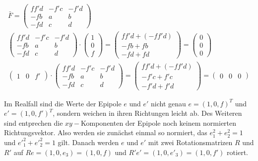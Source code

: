 


\begin{gather}
	\bar{F} = \begin{pmatrix}
	ff'd&-f'c&-f'd\\
	-fb&a&b\\
	-fd&c&d\label{eq:FSampson}
	\end{pmatrix}\\
	\begin{pmatrix}
	ff'd&-f'c&-f'd\\
	-fb&a&b\\
	-fd&c&d
	\end{pmatrix} \cdot \begin{pmatrix}
	1\\0\\f
	\end{pmatrix} = 
	\begin{pmatrix}
	ff'd + (-ff'd)\\
	-fb + fb\\
	-fd +fd
	\end{pmatrix}
	= 
	\begin{pmatrix}
	0\\0\\0
	\end{pmatrix}\\
	\begin{pmatrix}
	1&0&f'
	\end{pmatrix} \cdot
	\begin{pmatrix}
	ff'd&-f'c&-f'd\\
	-fb&a&b\\
	-fd&c&d
	\end{pmatrix} =
	\begin{pmatrix}
	ff'd + (-ff'd)\\
	-f'c + f'c\\
	-f'd + f'd
	\end{pmatrix} = 
		\begin{pmatrix}
	0&0&0
	\end{pmatrix}
\end{gather}

Im Realfall sind die Werte der Epipole $e$ und $e'$ nicht genau $e = (1,0,f)^T$ und $e' = (1,0,f')^T$, sondern weichen in ihren Richtungen leicht ab. Des Weiteren sind entprechen die $xy-$Komponenten der Epipole noch keinem normierten Richtungsvektor. Also werden sie zunächst einmal so normiert, das $e^2_1 + e^2_2 = 1$ und $e'^2_1 + e'^2_2 = 1$ gilt. Danach werden $e$ und $e'$ mit zwei Rotationsmatrizen $R$ und $R'$ auf $Re = (1,0,e_3) = (1,0,f)$ und $R'e' = (1,0,e'_3)=(1,0,f')$ rotiert.

